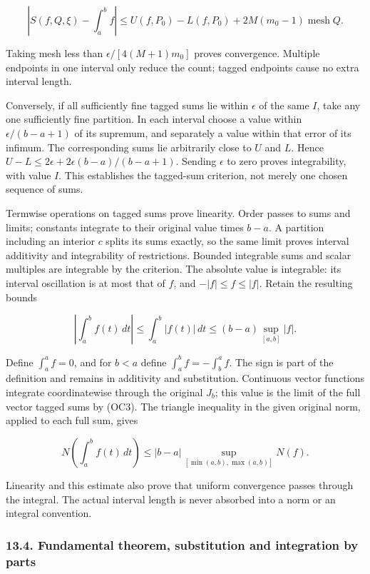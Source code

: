 \documentclass[
  11pt,
]{article}
\begin{document}
\[
 \left|S(f,Q,\xi)-\int_a^bf\right|
 \le U(f,P_0)-L(f,P_0)
       +2M(m_0-1)\operatorname{mesh}Q.
\tag{OC9}
\]

Taking mesh less than \(\epsilon/[4(M+1)m_0]\) proves convergence.
Multiple endpoints in one interval only reduce the count; tagged
endpoints cause no extra interval length.

Conversely, if all sufficiently fine tagged sums lie within \(\epsilon\)
of the same \(I\), take any one sufficiently fine partition. In each
interval choose a value within \(\epsilon/(b-a+1)\) of its supremum, and
separately a value within that error of its infimum. The corresponding
sums lie arbitrarily close to \(U\) and \(L\). Hence
\(U-L\le 2\epsilon+2\epsilon(b-a)/(b-a+1)\). Sending \(\epsilon\) to
zero proves integrability, with value \(I\). This establishes the
tagged-sum criterion, not merely one chosen sequence of sums.

Termwise operations on tagged sums prove linearity. Order passes to sums
and limits; constants integrate to their original value times \(b-a\). A
partition including an interior \(c\) splits its sums exactly, so the
same limit proves interval additivity and integrability of restrictions.
Bounded integrable sums and scalar multiples are integrable by the
criterion. The absolute value is integrable: its interval oscillation is
at most that of \(f\), and \(-|f|\le f\le|f|\). Retain the resulting
bounds

\[
 \left|\int_a^b f(t)\,dt\right|
 \le\int_a^b|f(t)|\,dt
 \le(b-a)\sup_{[a,b]}|f|.
\tag{OC10}
\]

Define \(\int_a^a f=0\), and for \(b<a\) define
\(\int_a^bf=-\int_b^af\). The sign is part of the definition and remains
in additivity and substitution. Continuous vector functions integrate
coordinatewise through the original \(J_b\); this value is the limit of
the full vector tagged sums by (OC3). The triangle inequality in the
given original norm, applied to each full sum, gives

\[
 N\left(\int_a^b f(t)\,dt\right)
 \le |b-a|\sup_{[\min(a,b),\max(a,b)]}N(f).
\tag{OC11}
\]

Linearity and this estimate also prove that uniform convergence passes
through the integral. The actual interval length is never absorbed into
a norm or an integral convention.

\subsubsection{13.4. Fundamental theorem, substitution and integration
by
parts}\label{fundamental-theorem-substitution-and-integration-by-parts}
\end{document}
